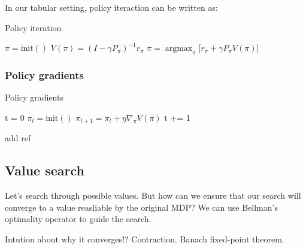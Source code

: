 In our tabular setting, policy iteraction can be written as:

\begin{algorithm}
\caption{Policy iteration}
\begin{algorithmic}[1]

    \State $\pi = \text{init}()$
      \State $V(\pi) =  (I - \gamma P_{\pi})^{-1} r_{\pi}$ 
      \State $\pi = \mathop{\text{argmax}}_\pi \big[r_{\pi} + \gamma P_{\pi}V(\pi) \big]$ 
    \EndWhile
    \State \algorithmicreturn{ $\pi$}
\EndProcedure

\end{algorithmic}
\end{algorithm}



\subsubsection{Policy gradients}

\begin{algorithm}
\caption{Policy gradients}
\begin{algorithmic}[1]

  \State t = 0
  \State $\pi_t = \text{init}()$
    \State $\pi_{t+1} = \pi_t + \eta \nabla_{\pi} V(\pi)$ 
    \State t += 1
  \EndWhile
  \State {}
\EndProcedure

\end{algorithmic}
\end{algorithm}


add ref


\subsection{Value search}

Let's search through possible values. But how can we ensure that our search will
converge to a value reasliable by the original MDP? We can use Bellman's
optimality operator to guide the search.

Intution about why it converges!? Contraction. Banach fixed-point theorem.


